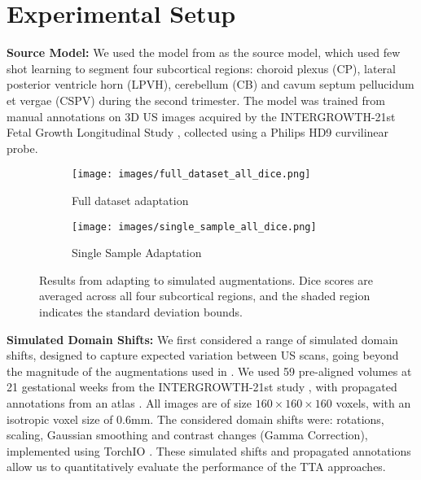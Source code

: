 \documentclass[conference]{IEEEtran}
\begin{document}
\section{Experimental Setup}

\noindent \textbf{Source Model:} We used the model from \cite{Hesse2022} as the source model, which used few shot learning to segment four subcortical regions: choroid plexus (CP), lateral posterior ventricle horn (LPVH), cerebellum (CB) and cavum septum pellucidum et vergae (CSPV) during the second trimester. The model was trained from manual annotations on 3D US images acquired by the INTERGROWTH-21st Fetal Growth Longitudinal Study \cite{papageorghiou2018intergrowth}, collected using a Philips HD9 curvilinear probe. 

\begin{figure}
    \centering
    \begin{subfigure}{0.45\textwidth}
        \centering
        \texttt{[image: images/full\_dataset\_all\_dice.png]}
        \caption{Full dataset adaptation}
        \label{fig:fulldataset}
    \end{subfigure}
    \vfill
    \begin{subfigure}{0.45\textwidth}
        \centering
        \texttt{[image: images/single\_sample\_all\_dice.png]}
        \caption{Single Sample Adaptation}
        \label{fig:singlesample}
    \end{subfigure}
    \caption{Results from adapting to simulated augmentations. Dice scores are averaged across all four subcortical regions, and the shaded region indicates the standard deviation bounds.}
    \label{fig:simulated shifts}
    \vspace*{-15pt}
\end{figure}

\noindent \textbf{Simulated Domain Shifts:} We first considered a range of simulated domain shifts, designed to capture expected variation between US scans, going beyond the magnitude of the augmentations used in \cite{Hesse2022}. We used 59 pre-aligned volumes at 21 gestational weeks from the INTERGROWTH-21st study \cite{papageorghiou2018intergrowth}, with propagated annotations from an atlas \cite{Hesse2022,Namburete2023}. All images are of size $160\times160\times160$ voxels, with an isotropic voxel size of 0.6mm. The considered domain shifts were: rotations, scaling, Gaussian smoothing and contrast changes (Gamma Correction), implemented using TorchIO \cite{perez-garcia_torchio_2021}. These simulated shifts and propagated annotations allow us to quantitatively evaluate the performance of the TTA approaches. 
\end{document}
